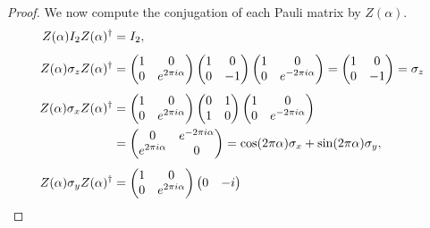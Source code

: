 \documentclass[a4paper,oneside, 12pt]{amsart}
\begin{document}
\begin{proof}
  We now compute the conjugation of each Pauli matrix by \( Z(\alpha) \).
  \begin{align*}
    Z(\alpha) I_2 Z(\alpha)^\dagger
    &= I_2, \\[0.25\baselineskip]
    Z(\alpha) \sigma_z Z(\alpha)^\dagger
    &=
      \begin{pmatrix}
        1 & 0 \\
        0 & e^{2\pi i \alpha}
      \end{pmatrix}
      \begin{pmatrix}
        1 & 0 \\
        0 & -1
      \end{pmatrix}
      \begin{pmatrix}
        1 & 0 \\
        0 & e^{- 2\pi i \alpha}
      \end{pmatrix}
      =
      \begin{pmatrix}
        1 & 0 \\
        0 & -1
      \end{pmatrix}
      =\sigma_{z}
    \\[0.25\baselineskip]
    Z(\alpha) \sigma_x Z(\alpha)^\dagger
    & =
      \begin{pmatrix}
        1 & 0 \\
        0 & e^{2\pi i \alpha}
      \end{pmatrix}
      \begin{pmatrix}
        0 & 1 \\
        1 & 0
      \end{pmatrix}
      \begin{pmatrix}
        1 & 0 \\
        0 & e^{-2\pi i \alpha}
      \end{pmatrix}\\
    & =
      \begin{pmatrix}
        0 & e^{-2\pi i \alpha} \\
        e^{2\pi i \alpha} & 0
      \end{pmatrix}
      =  \cos(2\pi \alpha) \sigma_x + \sin(2\pi \alpha) \sigma_y, \\[0.25\baselineskip]
    Z(\alpha) \sigma_y Z(\alpha)^\dagger
    & =
      \begin{pmatrix}
        1 & 0 \\
        0 & e^{2\pi i \alpha}
      \end{pmatrix}
      \begin{pmatrix}
        0 & -i \\

\end{pmatrix}
\end{align*}
\end{proof}
\end{document}
